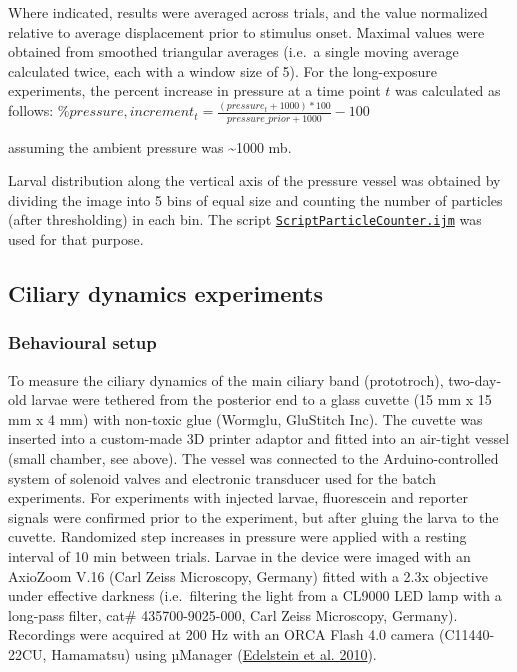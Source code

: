 \documentclass[
]{article}
\begin{document}
Where indicated, results were averaged across trials, and the value
normalized relative to average displacement prior to stimulus onset.
Maximal values were obtained from smoothed triangular averages (i.e.~a
single moving average calculated twice, each with a window size of 5).
For the long-exposure experiments, the percent increase in pressure at a
time point \(t\) was calculated as follows:
\(\%pressure,increment_t = \frac{(pressure_t + 1000)*100}{pressure\_{prior}+1000}-100\)

assuming the ambient pressure was \textasciitilde1000 mb.

Larval distribution along the vertical axis of the pressure vessel was
obtained by dividing the image into 5 bins of equal size and counting
the number of particles (after thresholding) in each bin. The script
\href{https://github.com/JekelyLab/Bezares_et_al_2023_Pressure/blob/main/Code/BatchBehaviour/ScriptParticleCounter.ijm}{\texttt{ScriptParticleCounter.ijm}}
was used for that purpose.

\hypertarget{ciliary-dynamics-experiments}{%
\subsection{Ciliary dynamics
experiments}\label{ciliary-dynamics-experiments}}

\hypertarget{behavioural-setup}{%
\subsubsection{Behavioural setup}\label{behavioural-setup}}

To measure the ciliary dynamics of the main ciliary band (prototroch),
two-day-old larvae were tethered from the posterior end to a glass
cuvette (15 mm x 15 mm x 4 mm) with non-toxic glue (Wormglu, GluStitch
Inc). The cuvette was inserted into a custom-made 3D printer adaptor and
fitted into an air-tight vessel (small chamber, see above). The vessel
was connected to the Arduino-controlled system of solenoid valves and
electronic transducer used for the batch experiments. For experiments
with injected larvae, fluorescein and reporter signals were confirmed
prior to the experiment, but after gluing the larva to the cuvette.
Randomized step increases in pressure were applied with a resting
interval of 10 min between trials. Larvae in the device were imaged with
an AxioZoom V.16 (Carl Zeiss Microscopy, Germany) fitted with a 2.3x
objective under effective darkness (i.e.~filtering the light from a
CL9000 LED lamp with a long-pass filter, cat\# 435700-9025-000, Carl
Zeiss Microscopy, Germany). Recordings were acquired at 200 Hz with an
ORCA Flash 4.0 camera (C11440-22CU, Hamamatsu) using µManager
(\protect\hyperlink{ref-edelstein2010}{Edelstein et al. 2010}).
\end{document}
